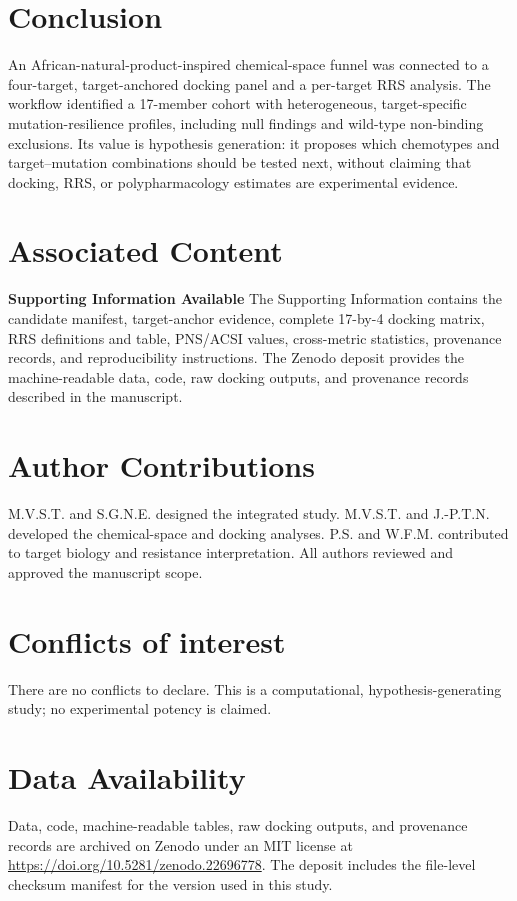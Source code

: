 \documentclass[journal=jcisd8,manuscript=article]{achemso}
\begin{document}
\section{Conclusion}\label{sec:conclusion}
An African-natural-product-inspired chemical-space funnel was connected to a four-target, target-anchored docking panel and a per-target RRS analysis. The workflow identified a 17-member cohort with heterogeneous, target-specific mutation-resilience profiles, including null findings and wild-type non-binding exclusions. Its value is hypothesis generation: it proposes which chemotypes and target--mutation combinations should be tested next, without claiming that docking, RRS, or polypharmacology estimates are experimental evidence.

\section*{Associated Content}
\textbf{Supporting Information Available}
The Supporting Information contains the candidate manifest, target-anchor evidence, complete 17-by-4 docking matrix, RRS definitions and table, PNS/ACSI values, cross-metric statistics, provenance records, and reproducibility instructions. The Zenodo deposit provides the machine-readable data, code, raw docking outputs, and provenance records described in the manuscript.

\section*{Author Contributions}
M.V.S.T. and S.G.N.E. designed the integrated study. M.V.S.T. and J.-P.T.N. developed the chemical-space and docking analyses. P.S. and W.F.M. contributed to target biology and resistance interpretation. All authors reviewed and approved the manuscript scope.

\section*{Conflicts of interest}
There are no conflicts to declare. This is a computational, hypothesis-generating study; no experimental potency is claimed.

\section*{Data Availability}
Data, code, machine-readable tables, raw docking outputs, and provenance records are archived on Zenodo under an MIT license at \url{https://doi.org/10.5281/zenodo.22696778}. The deposit includes the file-level checksum manifest for the version used in this study.
\end{document}
